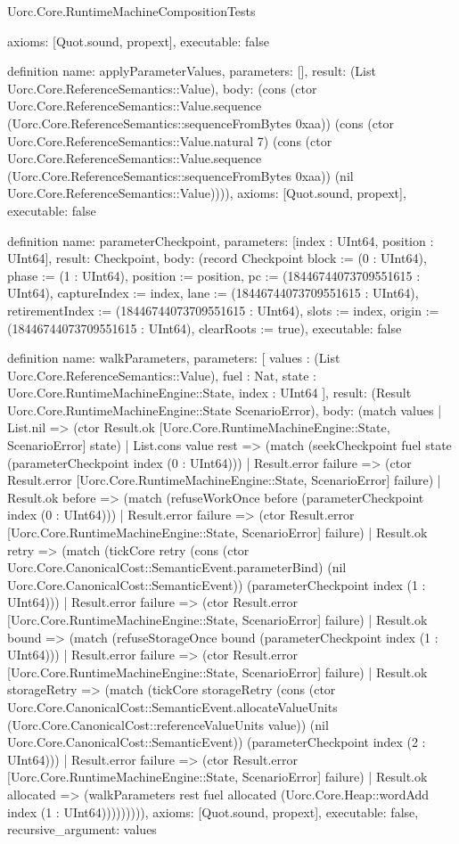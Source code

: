 \begin{lexlean}{Uorc.Core.RuntimeMachineCompositionTests}
\begin{semanticmodule}
{  axioms: [Quot.sound, propext],
  executable: false
}

definition{
  name: applyParameterValues,
  parameters: [],
  result: (List Uorc.Core.ReferenceSemantics::Value),
  body: (cons (ctor Uorc.Core.ReferenceSemantics::Value.sequence (Uorc.Core.ReferenceSemantics::sequenceFromBytes 0xaa)) (cons (ctor Uorc.Core.ReferenceSemantics::Value.natural 7) (cons (ctor Uorc.Core.ReferenceSemantics::Value.sequence (Uorc.Core.ReferenceSemantics::sequenceFromBytes 0xaa)) (nil Uorc.Core.ReferenceSemantics::Value)))),
  axioms: [Quot.sound, propext],
  executable: false
}

definition{
  name: parameterCheckpoint,
  parameters: [index : UInt64, position : UInt64],
  result: Checkpoint,
  body: (record Checkpoint {block := (0 : UInt64), phase := (1 : UInt64), position := position, pc := (18446744073709551615 : UInt64), captureIndex := index, lane := (18446744073709551615 : UInt64), retirementIndex := (18446744073709551615 : UInt64), slots := index, origin := (18446744073709551615 : UInt64), clearRoots := true}),
  executable: false
}

definition{
  name: walkParameters,
  parameters: [
    values : (List Uorc.Core.ReferenceSemantics::Value),
    fuel : Nat,
    state : Uorc.Core.RuntimeMachineEngine::State,
    index : UInt64
  ],
  result: (Result Uorc.Core.RuntimeMachineEngine::State ScenarioError),
  body: (match values
    | List.nil => (ctor Result.ok [Uorc.Core.RuntimeMachineEngine::State, ScenarioError] state)
    | List.cons value rest => (match (seekCheckpoint fuel state (parameterCheckpoint index (0 : UInt64)))
      | Result.error failure => (ctor Result.error [Uorc.Core.RuntimeMachineEngine::State, ScenarioError] failure)
      | Result.ok before => (match (refuseWorkOnce before (parameterCheckpoint index (0 : UInt64)))
        | Result.error failure => (ctor Result.error [Uorc.Core.RuntimeMachineEngine::State, ScenarioError] failure)
        | Result.ok retry => (match (tickCore retry (cons (ctor Uorc.Core.CanonicalCost::SemanticEvent.parameterBind) (nil Uorc.Core.CanonicalCost::SemanticEvent)) (parameterCheckpoint index (1 : UInt64)))
          | Result.error failure => (ctor Result.error [Uorc.Core.RuntimeMachineEngine::State, ScenarioError] failure)
          | Result.ok bound => (match (refuseStorageOnce bound (parameterCheckpoint index (1 : UInt64)))
            | Result.error failure => (ctor Result.error [Uorc.Core.RuntimeMachineEngine::State, ScenarioError] failure)
            | Result.ok storageRetry => (match (tickCore storageRetry (cons (ctor Uorc.Core.CanonicalCost::SemanticEvent.allocateValueUnits (Uorc.Core.CanonicalCost::referenceValueUnits value)) (nil Uorc.Core.CanonicalCost::SemanticEvent)) (parameterCheckpoint index (2 : UInt64)))
              | Result.error failure => (ctor Result.error [Uorc.Core.RuntimeMachineEngine::State, ScenarioError] failure)
              | Result.ok allocated => (walkParameters rest fuel allocated (Uorc.Core.Heap::wordAdd index (1 : UInt64))))))))),
  axioms: [Quot.sound, propext],
  executable: false,
  recursive_argument: values
}


\end{semanticmodule}
\end{lexlean}
